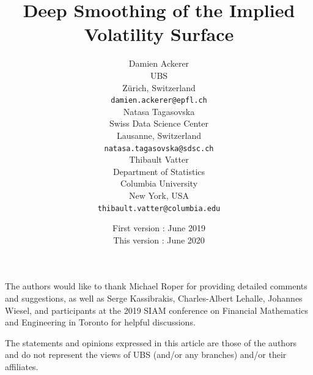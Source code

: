 \documentclass{article}
\title{Deep Smoothing of the Implied Volatility Surface}
\author{%
Damien Ackerer \\
UBS\\
Z\"urich, Switzerland \\
\texttt{damien.ackerer@epfl.ch} \\
\AND
Natasa Tagasovska\\
Swiss Data Science Center\\
Lausanne, Switzerland \\
\texttt{natasa.tagasovska@sdsc.ch} \\
\And
Thibault Vatter \\
Department of Statistics \\
Columbia University\\
New York, USA \\
 \texttt{thibault.vatter@columbia.edu} \\
}
\date{First version : June 2019 \\ \vspace{0.25em} This version : June 2020}
\begin{document}
\maketitle

\begin{abstract}

\end{abstract}














\begin{ack}
The authors would like to thank Michael Roper for providing detailed comments and suggestions, as well as Serge Kassibrakis, Charles-Albert Lehalle, Johannes Wiesel, and participants at the 2019 SIAM conference on Financial Mathematics and Engineering in Toronto for helpful discussions.

The statements and opinions expressed in this article are those of the authors and do not represent the views of UBS (and/or any branches) and/or their affiliates.
\end{ack}




\newpage
\begin{appendices}

\end{appendices}
\end{document}
